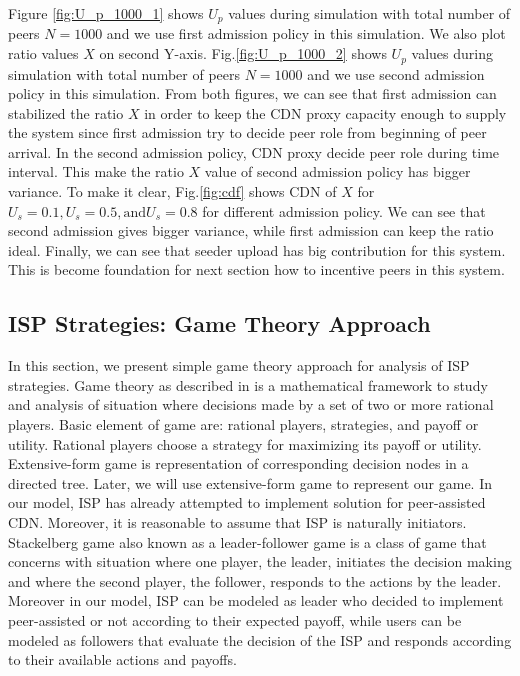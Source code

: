 \documentclass[paper]{ieice}
\begin{document}
Figure \ref{fig:U_p_1000_1} shows $U_p$ values during simulation with total number of peers $N=1000$ and we use first admission policy in this simulation. 
We also plot ratio values $X$ on second Y-axis.
Fig.\ref{fig:U_p_1000_2} shows $U_p$ values during simulation with total number of peers $N=1000$ and we use second admission policy in this simulation.  
From both figures, we can see that first admission can stabilized the ratio $X$ in order to keep the CDN proxy capacity enough to supply the system since first admission try to decide peer role from beginning of peer arrival. 
In the second admission policy, CDN proxy decide peer role during time interval.
This make the ratio $X$ value of second admission policy has bigger variance.
To make it clear, Fig.\ref{fig:cdf} shows CDN of $X$ for $U_s=0.1, U_s=0.5, \text{and}  U_s=0.8$ for different admission policy. 
We can see that second admission gives bigger variance, while first admission can keep the ratio ideal.
Finally, we can see that seeder upload has big contribution for this system. 
This is become foundation for next section how to incentive peers in this system.




\subsection{ISP Strategies: Game Theory Approach}
In this section, we present simple game theory approach for analysis of ISP strategies.
Game theory as described in \cite{gametheory} is a mathematical framework to study and analysis of situation where decisions made by a set of two or more rational players.
Basic element of game are: rational players, strategies, and payoff or utility.  
Rational players choose a strategy for maximizing its payoff or utility. 
Extensive-form game is representation of corresponding decision nodes in a directed tree.
Later, we will use extensive-form game to represent our game.
In our model, ISP has already attempted to implement solution for peer-assisted CDN.
Moreover, it is reasonable to assume that ISP is naturally initiators.  
Stackelberg game also known as a leader-follower game is a class of game that concerns with situation where one player, the leader, initiates the decision making and where the second player, the follower, responds to the actions by the leader.  
Moreover in our model, ISP can be modeled as leader who decided to implement peer-assisted or not according to their expected payoff, while users can be modeled as followers that evaluate the decision of the ISP and responds according to their available actions and payoffs.
\end{document}
